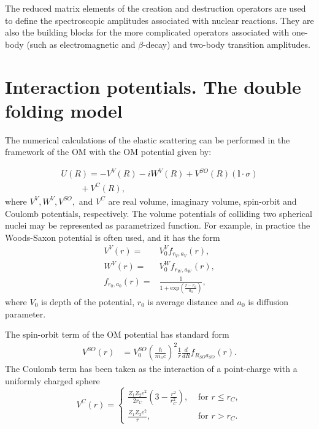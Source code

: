 \documentclass[
12pt, %
oneside, %
english, %
onehalfspacing, %
onehalfspacing, %
headsepline, %
]{MastersDoctoralThesis} %
\begin{document}
The reduced matrix elements of the creation and destruction operators
are used to define the spectroscopic amplitudes associated with nuclear reactions.
They are also the building blocks for the more complicated operators associated with
one-body (such as electromagnetic and $\beta$-decay) and two-body transition amplitudes.

\section{Interaction potentials. The double folding model}

The numerical calculations  of the elastic scattering  can be performed in the framework of the OM with the OM potential given by:

\begin{equation}\label{eqn:OP}
\begin{array}{l}
 U(R)=-V^{V}(R)-iW^{V}(R)+V^{SO}(R)( \mathbf{l} \cdot \sigma )\\
~~~ ~~~~~~~+V^C(R),
\end{array}
\end{equation}
where $V^{V}, W^{V}, V^{SO},$ and $V^C$ are real volume,  imaginary volume, spin-orbit and Coulomb potentials, respectively. The volume potentials of colliding two spherical nuclei may be represented as parametrized function. For example, in practice the Woods-Saxon potential is often used, and it has the form
\begin{align}
V^V\left( r \right) = & V_0^V f_{r_V, a_V} \left( r \right), \nonumber \\
W^V\left( r \right) = & V_0^W f_{r_W, a_W} \left( r \right), \nonumber \\
f_{r_0, a_0} \left( r \right) = &  \frac{1}{1+ \text{exp} \left( \frac{r-r_0}{a_0} \right) },
\end{align}
where $V_0$ is depth of the potential, $r_0$ is  average distance and $a_0$ is  diffusion parameter. 

The spin-orbit term of the OM potential has standard form
\begin{eqnarray}
V^{SO}(r) &= V_0^{SO}\left(\frac{\hbar}{m_\pi c}\right)^2 \frac{1}{r} \frac{d}{dR} f_{R_{SO} a_{SO}}(r).
\end{eqnarray}
The Coulomb term has been taken as the interaction of a point-charge with a uniformly charged sphere
\[
\label{coul}
V^C(r)=
\begin{cases}
\frac{Z_1 Z_2 e^2}{2 r_C} \left( 3- \frac{r^2}{r_C^2} \right), &\text{  for } r \leq r_C, \\
\frac{Z_1 Z_2 e^2}{r}, & \text{ for } r > r_C .
\end{cases}
\]
\end{document}
